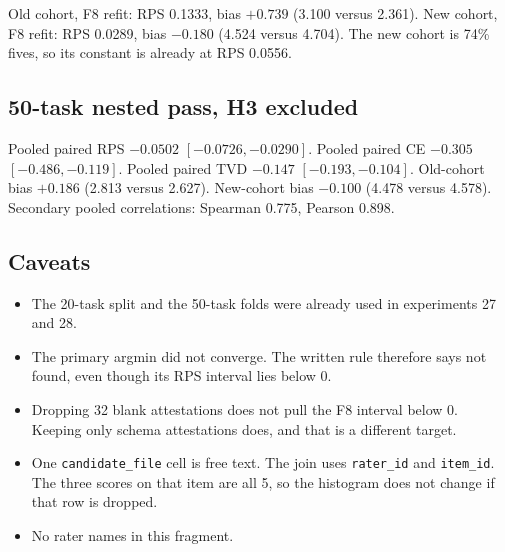 Old cohort, F8 refit: RPS 0.1333, bias $+0.739$ (3.100 versus 2.361). New cohort, F8 refit: RPS 0.0289, bias $-0.180$ (4.524 versus 4.704). The new cohort is 74\% fives, so its constant is already at RPS 0.0556.

\subsection*{50-task nested pass, H3 excluded}
\begin{center}\scriptsize\setlength{\tabcolsep}{3pt}
\end{center}

Pooled paired RPS $-0.0502$ $[-0.0726, -0.0290]$. Pooled paired CE $-0.305$ $[-0.486, -0.119]$. Pooled paired TVD $-0.147$ $[-0.193, -0.104]$. Old-cohort bias $+0.186$ (2.813 versus 2.627). New-cohort bias $-0.100$ (4.478 versus 4.578). Secondary pooled correlations: Spearman 0.775, Pearson 0.898.

\subsection*{Caveats}
\begin{itemize}
  \item The 20-task split and the 50-task folds were already used in experiments 27 and 28.
  \item The primary argmin did not converge. The written rule therefore says not found, even though its RPS interval lies below 0.
  \item Dropping 32 blank attestations does not pull the F8 interval below 0. Keeping only schema attestations does, and that is a different target.
  \item One \texttt{candidate\_file} cell is free text. The join uses \texttt{rater\_id} and \texttt{item\_id}. The three scores on that item are all 5, so the histogram does not change if that row is dropped.
  \item No rater names in this fragment.
\end{itemize}

